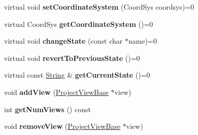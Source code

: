 \begin{DoxyCompactItemize}
\item 
virtual void {\bfseries set\+Coordinate\+System} (Coord\+Sys coordsys)=0\hypertarget{class_magnum_1_1_project_model_base_a14b212990c54553d4611e2e08864bc60}{}\label{class_magnum_1_1_project_model_base_a14b212990c54553d4611e2e08864bc60}

\item 
virtual Coord\+Sys {\bfseries get\+Coordinate\+System} ()=0\hypertarget{class_magnum_1_1_project_model_base_a2bd893f2380c5ddbdd51585eb2cec4bd}{}\label{class_magnum_1_1_project_model_base_a2bd893f2380c5ddbdd51585eb2cec4bd}

\item 
virtual void {\bfseries change\+State} (const char $\ast$name)=0\hypertarget{class_magnum_1_1_project_model_base_a3820026dbe018d0fa5638a61373386b2}{}\label{class_magnum_1_1_project_model_base_a3820026dbe018d0fa5638a61373386b2}

\item 
virtual void {\bfseries revert\+To\+Previous\+State} ()=0\hypertarget{class_magnum_1_1_project_model_base_aca11dcade7fdee6991a46acb75262850}{}\label{class_magnum_1_1_project_model_base_aca11dcade7fdee6991a46acb75262850}

\item 
virtual const \hyperlink{class_magnum_1_1_string}{String} \& {\bfseries get\+Current\+State} ()=0\hypertarget{class_magnum_1_1_project_model_base_a2faaed29af474ab75cfb3282d04309ba}{}\label{class_magnum_1_1_project_model_base_a2faaed29af474ab75cfb3282d04309ba}

\item 
void {\bfseries add\+View} (\hyperlink{class_magnum_1_1_project_view_base}{Project\+View\+Base} $\ast$view)\hypertarget{class_magnum_1_1_project_model_base_a6863c1d00474cde3bbb3fa921aea26a6}{}\label{class_magnum_1_1_project_model_base_a6863c1d00474cde3bbb3fa921aea26a6}

\item 
int {\bfseries get\+Num\+Views} () const \hypertarget{class_magnum_1_1_project_model_base_a3059d1e347cd6589b7b26f0db1d11535}{}\label{class_magnum_1_1_project_model_base_a3059d1e347cd6589b7b26f0db1d11535}

\item 
void {\bfseries remove\+View} (\hyperlink{class_magnum_1_1_project_view_base}{Project\+View\+Base} $\ast$view)\hypertarget{class_magnum_1_1_project_model_base_a12e2441ef5ec4b9a8e88e233a764f676}{}\label{class_magnum_1_1_project_model_base_a12e2441ef5ec4b9a8e88e233a764f676}


\end{DoxyCompactItemize}
